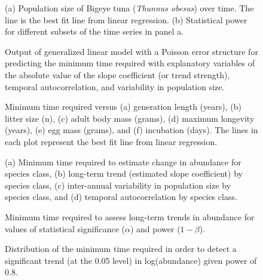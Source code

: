 \documentclass[12pt,]{article}
\begin{document}
\setcounter{figure}{0} \renewcommand{\thefigure}{S\arabic{figure}}

\begin{figure}[htbp]
\centering
\caption{(a) Population size of Bigeye tuna (\emph{Thunnus obesus}) over
time. The line is the best fit line from linear regression. (b)
Statistical power for different subsets of the time series in panel
a.\label{fig:empirical_approach_example}}
\end{figure}

\begin{figure}[htbp]
\centering
\caption{Output of generalized linear model with a Poisson error
structure for predicting the minimum time required with explanatory
variables of the absolute value of the slope coefficient (or trend
strength), temporal autocorrelation, and variability in population
size.\label{fig:poisson_model}}
\end{figure}

\begin{figure}[htbp]
\centering
\caption{Minimum time required versus (a) generation length (years), (b)
litter size (n), (c) adult body mass (grams), (d) maximum longevity
(years), (e) egg mass (grams), and (f) incubation (days). The lines in
each plot represent the best fit line from linear
regression.\label{fig:biological_correlates}}
\end{figure}

\begin{figure}[htbp]
\centering
\caption{(a) Minimum time required to estimate change in abundance for
species class, (b) long-term trend (estimated slope coefficient) by
species class, (c) inter-annual variability in population size by species
class, and (d) temporal autocorrelation by species
class.\label{fig:class}}
\end{figure}

\begin{figure}[htbp]
\centering
\caption{Minimum time required to assess long-term trends in abundance
for values of statistical significance (\(\alpha\)) and power
(\(1-\beta\)).\label{fig:min_time_vs_alpha_beta}}
\end{figure}

\begin{figure}[htbp]
\centering
\caption{Distribution of the minimum time required in order to detect a
significant trend (at the 0.05 level) in log(abundance) given power of
0.8.\label{fig:min_time_dist_log_pop}}
\end{figure}
\end{document}
